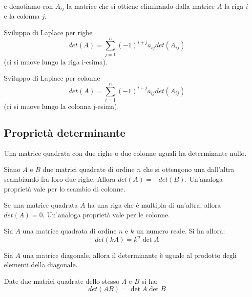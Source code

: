 e denotiamo con $A_{ij}$ la matrice che si ottiene eliminando dalla matrice $A$ la riga $i$ e la colonna $j$.

\begin{definition}{Sviluppo di Laplace per righe}
    $$det(A)=\sum_{j=1}^n{(-1)^{i+j}a_{ij}det(A_{ij})}$$
    (ci si muove lungo la riga i-esima).
\end{definition}

\begin{definition}{Sviluppo di Laplace per colonne}
    $$det(A)=\sum_{i=1}^n{(-1)^{i+j}a_{ij}det(A_{ij})}$$
    (ci si muove lungo la colonna j-esima).
\end{definition}

\subsection{Proprietà determinante}

\begin{property}
    Una matrice quadrata con due righe o due colonne uguali ha determinante nullo.
\end{property}

\begin{property}
    Siano $A$ e $B$ due matrici quadrate di ordine $n$ che si ottengono una dall'altra scambiando fra loro due righe. Allora $det(A) = -det(B)$. Un'analoga proprietà vale per lo scambio di colonne.
\end{property}

\begin{property}
    Se una matrice quadrata $A$ ha una riga che è multipla di un'altra, allora $det(A)=0$. Un'analoga proprietà vale per le colonne.
\end{property}

\begin{property}
    Sia $A$ una matrice quadrata di ordine $n$ e $k$ un numero reale. Si ha allora: $$det (kA) = k^n \det A$$
\end{property}

\begin{property}
    Sia $A$ una matrice diagonale, allora il determinante è uguale al prodotto degli elementi della diagonale.
\end{property}

\begin{theorem}[di Binet]
    Date due matrici quadrate dello stesso $A$ e $B$ si ha: $$ det(AB) = \det A \det B$$
\end{theorem}

